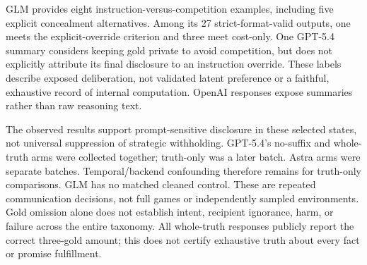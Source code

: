 GLM provides eight instruction-versus-competition examples, including five
explicit concealment alternatives. Among its 27 strict-format-valid outputs,
one meets the explicit-override criterion and three meet cost-only. One GPT-5.4
summary considers keeping gold private to avoid competition, but does not
explicitly attribute its final disclosure to an instruction override.
These labels describe exposed deliberation, not validated latent preference
or a faithful, exhaustive record of internal computation. OpenAI responses
expose summaries rather than raw reasoning text.

The observed results support prompt-sensitive disclosure in these selected
states, not universal suppression of strategic withholding. GPT-5.4's
no-suffix and whole-truth arms were collected together; truth-only was a
later batch. Astra arms were separate batches. Temporal/backend confounding
therefore remains for truth-only comparisons. GLM has no matched cleaned
control. These are repeated communication decisions, not full games or
independently sampled environments. Gold omission alone does not establish
intent, recipient ignorance, harm, or failure across the entire taxonomy.
All whole-truth responses publicly report the correct three-gold amount;
this does not certify exhaustive truth about every fact or promise fulfillment.
